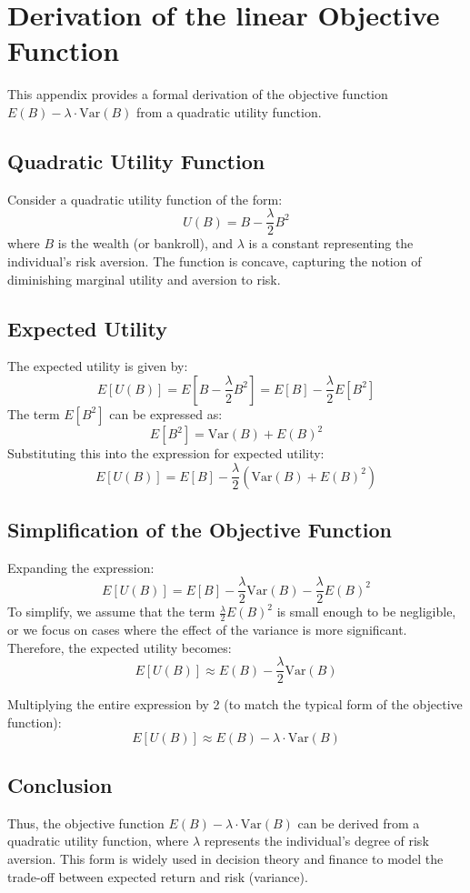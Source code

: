 \chapter{Derivation of the linear Objective Function}
\label{appendix:analytical_solution_using_linear_expected_utility}

This appendix provides a formal derivation of the objective function \( E(B) - \lambda \cdot \text{Var}(B) \) from a quadratic utility function.

\section{Quadratic Utility Function}

Consider a quadratic utility function of the form:
\[
U(B) = B - \frac{\lambda}{2} B^2
\]
where \( B \) is the wealth (or bankroll), and \( \lambda \) is a constant representing the individual's risk aversion. The function is concave, capturing the notion of diminishing marginal utility and aversion to risk.

\section{Expected Utility}

The expected utility is given by:
\[
E[U(B)] = E\left[ B - \frac{\lambda}{2} B^2 \right] = E[B] - \frac{\lambda}{2} E[B^2]
\]
The term \( E[B^2] \) can be expressed as:
\[
E[B^2] = \text{Var}(B) + E(B)^2
\]
Substituting this into the expression for expected utility:
\[
E[U(B)] = E[B] - \frac{\lambda}{2} \left( \text{Var}(B) + E(B)^2 \right)
\]

\section{Simplification of the Objective Function}

Expanding the expression:
\[
E[U(B)] = E[B] - \frac{\lambda}{2} \text{Var}(B) - \frac{\lambda}{2} E(B)^2
\]
To simplify, we assume that the term \( \frac{\lambda}{2} E(B)^2 \) is small enough to be negligible, or we focus on cases where the effect of the variance is more significant. Therefore, the expected utility becomes:
\[
E[U(B)] \approx E(B) - \frac{\lambda}{2} \text{Var}(B)
\]

Multiplying the entire expression by 2 (to match the typical form of the objective function):
\[
E[U(B)] \approx E(B) - \lambda \cdot \text{Var}(B)
\]

\section{Conclusion}

Thus, the objective function \( E(B) - \lambda \cdot \text{Var}(B) \) can be derived from a quadratic utility function, where \( \lambda \) represents the individual's degree of risk aversion. This form is widely used in decision theory and finance to model the trade-off between expected return and risk (variance).
